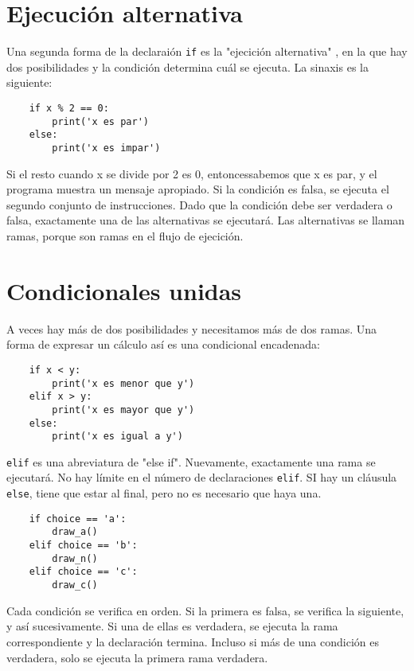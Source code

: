 \section{Ejecución alternativa}

Una segunda forma de la declaraión \texttt{if} es la "ejecición alternativa" , en la que hay dos posibilidades y la condición determina cuál se ejecuta. La sinaxis es la siguiente:

\begin{lstlisting}
    if x % 2 == 0:
        print('x es par')
    else:
        print('x es impar')
\end{lstlisting}

Si el resto cuando x se divide por 2 es 0, entoncessabemos que x es par, y el programa muestra un mensaje apropiado. Si la condición es falsa, se ejecuta el segundo conjunto de instrucciones. Dado que la condición debe ser verdadera o falsa, exactamente una de las alternativas se ejecutará. Las alternativas se llaman ramas, porque son ramas en el flujo de ejecición.

\section{Condicionales unidas}

A veces hay más de dos posibilidades y necesitamos más de dos ramas. Una forma de expresar un cálculo así es una condicional encadenada:

\begin{lstlisting}
    if x < y:
        print('x es menor que y')
    elif x > y:
        print('x es mayor que y')
    else:
        print('x es igual a y')
\end{lstlisting}

\texttt{elif} es una abreviatura de "else if". Nuevamente, exactamente una rama se ejecutará. No hay límite en el número de declaraciones \texttt{elif}. SI hay un cláusula \texttt{else}, tiene que estar al final, pero no es necesario que haya una.

\begin{lstlisting}
    if choice == 'a':
        draw_a()
    elif choice == 'b':
        draw_n()
    elif choice == 'c':
        draw_c()
\end{lstlisting}

Cada condición se verifica en orden. Si la primera es falsa, se verifica la siguiente, y así sucesivamente. Si una de ellas es verdadera, se ejecuta la rama correspondiente y la declaración termina. Incluso si más de una condición es verdadera, solo se ejecuta la primera rama verdadera.

